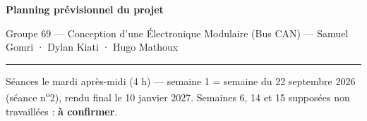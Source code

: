 \documentclass[10pt,a4paper,landscape]{article}
\begin{document}
\begin{center}
  {\color{canblue}\Large\bfseries Planning prévisionnel du projet\par}
  \vspace{1pt}
  {\small Groupe 69 — Conception d'une Électronique Modulaire (Bus CAN) — Samuel Gomri · Dylan Kiati · Hugo Mathoux\par}
  {\color{canamber}\rule{0.4\textwidth}{1.2pt}\par}
\end{center}

\vspace{-10pt}
\noindent\scriptsize
Séances le mardi après-midi (4 h) — semaine 1 = semaine du 22 septembre 2026 (séance n\textsuperscript{o}2), rendu final le 10 janvier 2027.
Semaines 6, 14 et 15 supposées non travaillées : \textbf{à confirmer}.
\normalsize

\vspace{1pt}
\end{document}
